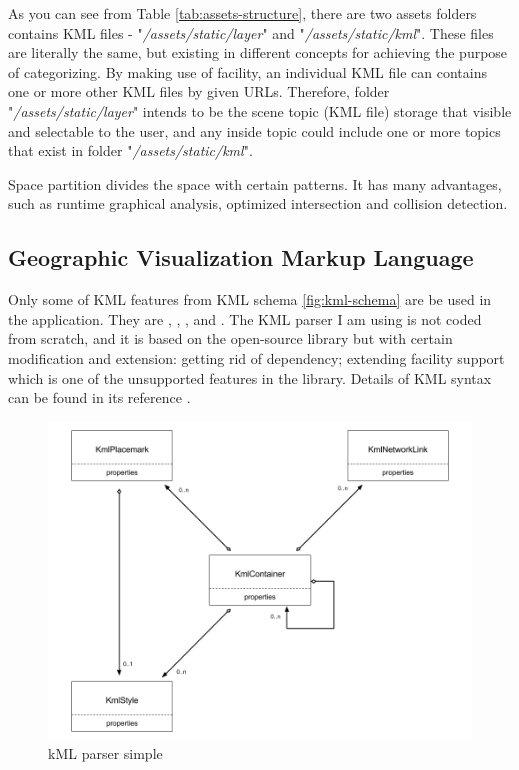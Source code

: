 As you can see from Table \ref{tab:assets-structure}, there are two assets folders contains KML files - "\emph{/assets/static/layer}" and "\emph{/assets/static/kml}". These files are literally the same, but existing in different concepts for achieving the purpose of categorizing. By making use of  facility, an individual KML file can contains one or more other KML files by given URLs. Therefore, folder "\emph{/assets/static/layer}" intends to be the scene topic (KML file) storage that visible and selectable to the user, and any inside topic could include one or more topics that exist in folder "\emph{/assets/static/kml}".

Space partition divides the space with certain patterns. It has many advantages, such as runtime graphical analysis, optimized intersection and collision detection.

\subsection{Geographic Visualization Markup Language}
\label{section:kml}

Only some of KML features from KML schema \ref{fig:kml-schema} are be used in the application. They are , , , and . The KML parser I am using is not coded from scratch, and it is based on the open-source library  \cite{google.code-kml.2016} but with certain modification and extension: getting rid of  dependency; extending  facility support which is one of the unsupported features in the library. Details of KML syntax can be found in its reference \cite{google.kml.2016}.

\begin{figure}[H]
\caption{kML parser simple}
\label{fig:kml-parser-simple}
\centering
\includegraphics[width=\textwidth, keepaspectratio]{Figures/kml-parser-simple.png}
\decoRule
\end{figure}


